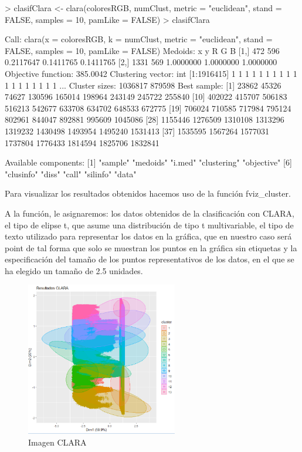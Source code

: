 \documentclass [a4paper] {article}
\begin{document}
\begin{Schunk}
\begin{Sinput}
> clasifClara <- clara(coloresRGB, numClust, metric = "euclidean", stand = FALSE, samples = 10, pamLike = FALSE)
> clasifClara
\end{Sinput}
\begin{Soutput}
Call:	 clara(x = coloresRGB, k = numClust, metric = "euclidean", stand = FALSE,      samples = 10, pamLike = FALSE) 
Medoids:
        x   y         R         G         B
[1,]  472 596 0.2117647 0.1411765 0.1411765
[2,] 1331 569 1.0000000 1.0000000 1.0000000
Objective function:	 385.0042
Clustering vector: 	 int [1:1916415] 1 1 1 1 1 1 1 1 1 1 1 1 1 1 1 1 1 1 ...
Cluster sizes:	    	 1036817 879598 
Best sample:
 [1]   23862   45326   74627  130596  165014  198964  243149  245722  255840
[10]  402022  415707  506183  516213  542677  633708  634702  648533  672775
[19]  706024  710585  717984  795124  802961  844047  892881  995609 1045086
[28] 1155446 1276509 1310108 1313296 1319232 1430498 1493954 1495240 1531413
[37] 1535595 1567264 1577031 1737804 1776433 1814594 1825706 1832841

Available components:
 [1] "sample"     "medoids"    "i.med"      "clustering" "objective" 
 [6] "clusinfo"   "diss"       "call"       "silinfo"    "data"      
\end{Soutput}
\end{Schunk}


\newpage

Para visualizar los resultados obtenidos hacemos uso de la función fviz_cluster.

A la función, le asignaremos: los datos obtenidos de la clasificación con CLARA,
el tipo de elipse t, que asume una distribución de tipo t multivariable, el tipo de texto utilizado para representar los datos en la gráfica, 
que en nuestro caso será point de tal forma que solo se muestran los puntos en la gráfica sin etiquetas y la especificación del tamaño de los puntos representativos de los datos,
en el que se ha elegido un tamaño de 2.5 unidades.


\begin{figure}[!htbp]
  \centering
  \includegraphics[width=250px,keepaspectratio]{./graficoClara.png}
  \caption{Imagen CLARA}
  \label{fig:original}
\end{figure}
\end{document}
